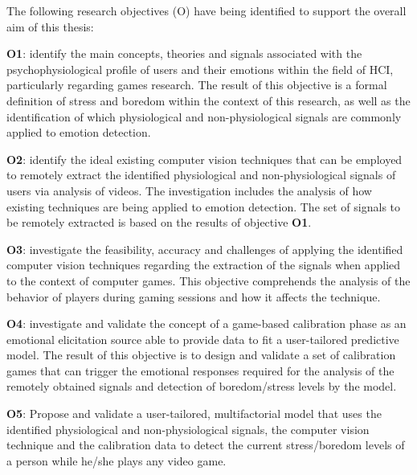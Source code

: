 The following research objectives (O) have being identified to support the overall aim of this thesis:

\textbf{O1}: identify the main concepts, theories and signals associated with the psychophysiological profile of users and their emotions within the field of HCI, particularly regarding games research. The result of this objective is a formal definition of stress and boredom within the context of this research, as well as the identification of which physiological and non-physiological signals are commonly applied to emotion detection.

\textbf{O2}: identify the ideal existing computer vision techniques that can be employed to remotely extract the identified physiological and non-physiological signals of users via analysis of videos. The investigation includes the analysis of how existing techniques are being applied to emotion detection. The set of signals to be remotely extracted is based on the results of objective \textbf{O1}.

\textbf{O3}: investigate the feasibility, accuracy and challenges of applying the identified computer vision techniques regarding the extraction of the signals when applied to the context of computer games. This objective comprehends the analysis of the behavior of players during gaming sessions and how it affects the technique.

\textbf{O4}: investigate and validate the concept of a game-based calibration phase as an emotional elicitation source able to provide data to fit a user-tailored predictive model. The result of this objective is to design and validate a set of calibration games that can trigger the emotional responses required for the analysis of the remotely obtained signals and detection of boredom/stress levels by the model.

\textbf{O5}: Propose and validate a user-tailored, multifactorial model that uses the identified physiological and non-physiological signals, the computer vision technique and the calibration data to detect the current stress/boredom levels of a person while he/she plays any video game.


